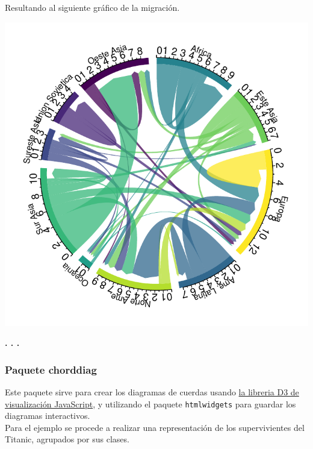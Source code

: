\documentclass{article}\usepackage[]{graphicx}\usepackage[]{color}
\makeatletter
\def\maxwidth{ %
  \ifdim\Gin@nat@width>\linewidth
    \linewidth
  \else
    \Gin@nat@width
  \fi
}
\newenvironment{knitrout}{}{} %
\makeatother
\begin{document}
\clearpage
Resultando al siguiente gr\'afico de la migraci\'on.
\begin{knitrout}
\color{fgcolor}

{\centering \includegraphics[width=\maxwidth]{figure/plot-1} 

}



\end{knitrout}
\begin{center}
\textbf{. . .}
\end{center}
\subsubsection{Paquete chorddiag}
Este paquete\cite{docu_chorddiag} sirve para crear los diagramas de cuerdas usando \href{https://d3js.org/}{la libreria D3 de visualizaci\'on JavaScript}, y utilizando el paquete \texttt{htmlwidgets} para guardar los diagramas interactivos.~\\
Para el ejemplo se procede a realizar una representaci\'on de los supervivientes del Titanic, agrupados por sus clases.~\\
\end{document}
